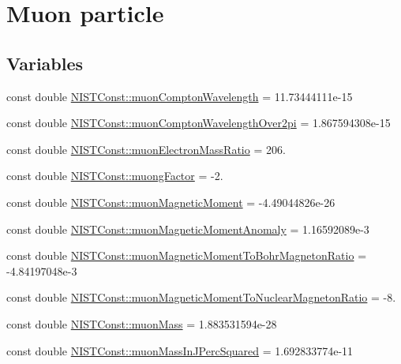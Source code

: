 \hypertarget{group___n_i_s_t_const-_muon}{}\section{Muon particle}
\label{group___n_i_s_t_const-_muon}
\subsection*{Variables}
\begin{DoxyCompactItemize}
\item 
const double \mbox{\hyperlink{group___n_i_s_t_const-_muon_ga344399a1ac3bc2f57614ccdca4f4f1c1}{N\+I\+S\+T\+Const\+::muon\+Compton\+Wavelength}} = 11.\+73444111e-\/15
\item 
const double \mbox{\hyperlink{group___n_i_s_t_const-_muon_ga4a55b49a126bc1f308e50dfa6869cd76}{N\+I\+S\+T\+Const\+::muon\+Compton\+Wavelength\+Over2pi}} = 1.\+867594308e-\/15
\item 
const double \mbox{\hyperlink{group___n_i_s_t_const-_muon_gadb71fd23b688fbab91f52a53eee8081c}{N\+I\+S\+T\+Const\+::muon\+Electron\+Mass\+Ratio}} = 206.
\item 
const double \mbox{\hyperlink{group___n_i_s_t_const-_muon_ga777044d532403774e1c4a55ff020766d}{N\+I\+S\+T\+Const\+::muong\+Factor}} = -\/2.
\item 
const double \mbox{\hyperlink{group___n_i_s_t_const-_muon_gacd182505756807ab247465449d821110}{N\+I\+S\+T\+Const\+::muon\+Magnetic\+Moment}} = -\/4.\+49044826e-\/26
\item 
const double \mbox{\hyperlink{group___n_i_s_t_const-_muon_ga555a2705f41a9f392e90147c58ae7527}{N\+I\+S\+T\+Const\+::muon\+Magnetic\+Moment\+Anomaly}} = 1.\+16592089e-\/3
\item 
const double \mbox{\hyperlink{group___n_i_s_t_const-_muon_ga417520e932b056d62595de6d9a75be3e}{N\+I\+S\+T\+Const\+::muon\+Magnetic\+Moment\+To\+Bohr\+Magneton\+Ratio}} = -\/4.\+84197048e-\/3
\item 
const double \mbox{\hyperlink{group___n_i_s_t_const-_muon_gac809a61292c5b8c5fe4679bd944729d8}{N\+I\+S\+T\+Const\+::muon\+Magnetic\+Moment\+To\+Nuclear\+Magneton\+Ratio}} = -\/8.
\item 
const double \mbox{\hyperlink{group___n_i_s_t_const-_muon_ga4fed15b8e94009be07c0a5f17af9ffb8}{N\+I\+S\+T\+Const\+::muon\+Mass}} = 1.\+883531594e-\/28
\item 
const double \mbox{\hyperlink{group___n_i_s_t_const-_muon_ga98b4dada2be08e51ae363d18d745d60e}{N\+I\+S\+T\+Const\+::muon\+Mass\+In\+J\+Perc\+Squared}} = 1.\+692833774e-\/11

\end{DoxyCompactItemize}
